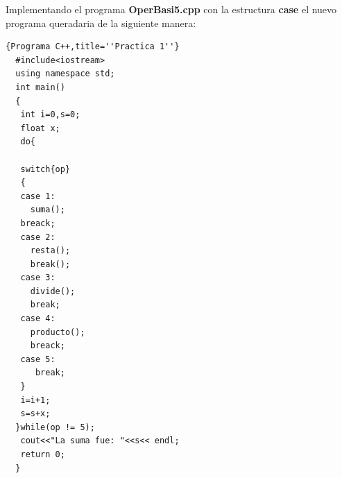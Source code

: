 \documentclass[a4paper,12pt,spanish]{article}
\newcommand\mylstcaption{}
\begin{document}
    Implementando el programa \textbf{OperBasi5.cpp} con la estructura \textbf{case} el nuevo programa queradaria de la siguiente manera:

    \renewcommand\mylstcaption{\textbf{OperBAsi6.cpp}}

\begin{lstlisting}[frame=trBL,caption=\mylstcaption]{Programa C++,title=''Practica 1''}
  #include<iostream>
  using namespace std;
  int main()
  {
   int i=0,s=0;
   float x;
   do{

   switch{op}
   {
   case 1:
     suma(); 
   breack;
   case 2:
     resta();
     break();
   case 3:
     divide();
     break;
   case 4:
     producto();
     breack;
   case 5:
      break;
   }
   i=i+1;
   s=s+x;
  }while(op != 5);
   cout<<"La suma fue: "<<s<< endl;
   return 0;
  }
\end{lstlisting}
\vfill
\end{document}
